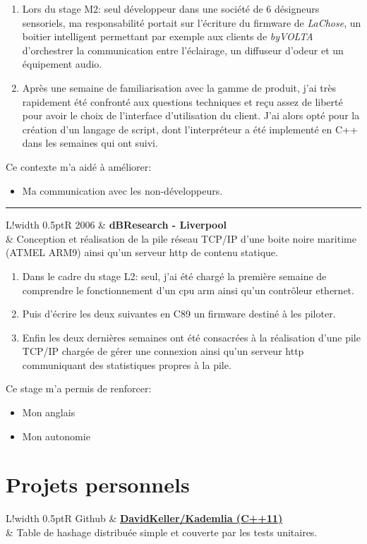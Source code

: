 \documentclass[10pt]{article}
\newcommand{\VRule}{{\color{lightgray}\vrule width 0.5pt}}
\newcommand{\HRule}{\begin{center}{\color{lightgray}\rule{0.5\textwidth}{0.5pt}}\end{center}}
\begin{document}
\begin{enumerate}
\item Lors du stage M2: seul développeur dans une société de 6
  désigneurs sensoriels, ma responsabilité portait sur
  l'écriture du firmware de \textit{LaChose}, un boitier intelligent
  permettant par exemple aux clients de \textit{byVOLTA} d'orchestrer 
  la communication entre l'éclairage, un diffuseur d'odeur et un 
  équipement audio.

\item Après une semaine de familiarisation avec la gamme de produit,
  j'ai très rapidement été confronté aux questions techniques et reçu
  assez de liberté pour avoir le choix de l'interface d'utilisation 
  du client. J'ai alors opté pour la création d'un langage de script,
  dont l'interpréteur a été implementé en C++ dans les semaines 
  qui ont suivi.
\end{enumerate}

Ce contexte m'a aidé à améliorer:
\begin{itemize}
\item Ma communication avec les non-développeurs.
\end{itemize}

\HRule

\begin{longtable}{L!{\VRule}R}
2006 & \textbf{dBResearch - Liverpool}
\\
& Conception et réalisation de la pile réseau TCP/IP d'une boite noire 
  maritime (ATMEL ARM9) ainsi qu'un serveur http de contenu statique.
\end{longtable}

\begin{enumerate}
\item Dans le cadre du stage L2: seul, j'ai été chargé la première semaine de
  comprendre le fonctionnement d'un cpu arm ainsi qu'un contrôleur ethernet.

\item Puis d'écrire les deux suivantes en C89 un firmware destiné à 
  les piloter.

\item Enfin les deux dernières semaines ont été consacrées à la réalisation
  d'une pile TCP/IP chargée de gérer une connexion ainsi
  qu'un serveur http communiquant des statistiques propres à la pile.
\end{enumerate}

Ce stage m'a permis de renforcer:
\begin{itemize}
\item Mon anglais
\item Mon autonomie
\end{itemize}

\section*{Projets personnels}
\begin{longtable}{L!{\VRule}R}
Github
& \href{https://github.com/DavidKeller/kademlia}{{\bf DavidKeller/Kademlia (C++11)}}
\\
& Table de hashage distribuée simple et couverte par les tests unitaires.

\end{longtable}
\end{document}
